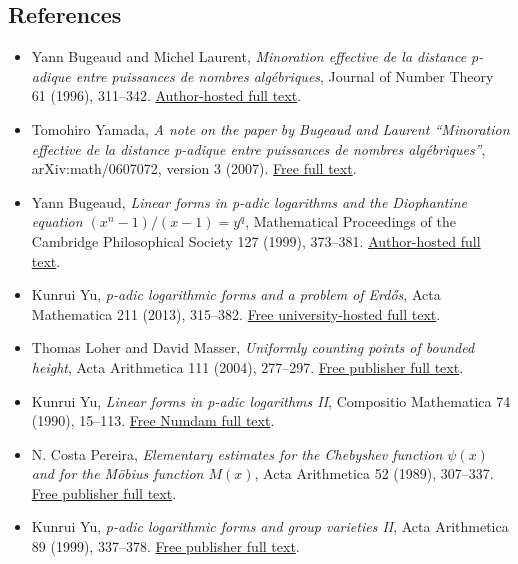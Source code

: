 \documentclass[
  11pt,
  a4paper,
]{article}
\begin{document}
\subsection{References}\label{references}

\begin{itemize}
\item
  Yann Bugeaud and Michel Laurent, \emph{Minoration effective de la
  distance p-adique entre puissances de nombres algébriques}, Journal of
  Number Theory 61 (1996), 311--342.
  \href{https://irma.math.unistra.fr/~bugeaud/travaux/logpadicdef.ps}{Author-hosted
  full text}.
\item
  Tomohiro Yamada, \emph{A note on the paper by Bugeaud and Laurent
  ``Minoration effective de la distance p-adique entre puissances de
  nombres algébriques''}, arXiv:math/0607072, version 3 (2007).
  \href{https://arxiv.org/pdf/math/0607072}{Free full text}.
\item
  Yann Bugeaud, \emph{Linear forms in p-adic logarithms and the
  Diophantine equation \((x^n-1)/(x-1)=y^q\)}, Mathematical Proceedings
  of the Cambridge Philosophical Society 127 (1999), 373--381.
  \href{https://irma.math.unistra.fr/~bugeaud/travaux/shopuissdef.ps}{Author-hosted
  full text}.
\item
  Kunrui Yu, \emph{p-adic logarithmic forms and a problem of Erdős},
  Acta Mathematica 211 (2013), 315--382.
  \href{https://archive.ymsc.tsinghua.edu.cn/pacm_download/117/6782-11511_2013_Article_106.pdf}{Free
  university-hosted full text}.
\item
  Thomas Loher and David Masser, \emph{Uniformly counting points of
  bounded height}, Acta Arithmetica 111 (2004), 277--297.
  \href{https://www.impan.pl/shop/en/publication/transaction/download/product/82907}{Free
  publisher full text}.
\item
  Kunrui Yu, \emph{Linear forms in p-adic logarithms II}, Compositio
  Mathematica 74 (1990), 15--113.
  \href{https://www.numdam.org/item/CM_1990__74_1_15_0.pdf}{Free Numdam
  full text}.
\item
  N. Costa Pereira, \emph{Elementary estimates for the Chebyshev
  function \(\psi(x)\) and for the Möbius function \(M(x)\)}, Acta
  Arithmetica 52 (1989), 307--337.
  \href{https://www.impan.pl/shop/en/publication/transaction/download/product/106154}{Free
  publisher full text}.
\item
  Kunrui Yu, \emph{p-adic logarithmic forms and group varieties II},
  Acta Arithmetica 89 (1999), 337--378.
  \href{https://matwbn.icm.edu.pl/ksiazki/aa/aa89/aa8944.pdf}{Free
  publisher full text}.
\end{itemize}
\end{document}
